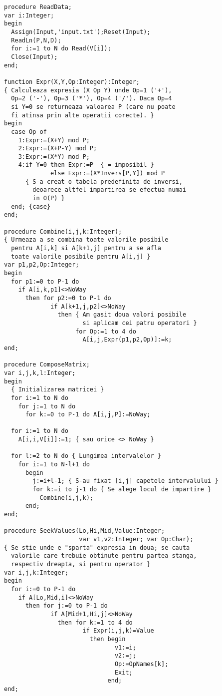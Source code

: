\begin{verbatim}
procedure ReadData;
var i:Integer;
begin
  Assign(Input,'input.txt');Reset(Input);
  ReadLn(P,N,D);
  for i:=1 to N do Read(V[i]);
  Close(Input);
end;

function Expr(X,Y,Op:Integer):Integer;
{ Calculeaza expresia (X Op Y) unde Op=1 ('+'),
  Op=2 ('-'), Op=3 ('*'), Op=4 ('/'). Daca Op=4
  si Y=0 se returneaza valoarea P (care nu poate
  fi atinsa prin alte operatii corecte). }
begin
  case Op of
    1:Expr:=(X+Y) mod P;
    2:Expr:=(X+P-Y) mod P;
    3:Expr:=(X*Y) mod P;
    4:if Y=0 then Expr:=P  { = imposibil }
             else Expr:=(X*Invers[P,Y]) mod P
      { S-a creat o tabela predefinita de inversi,
        deoarece altfel impartirea se efectua numai
        in O(P) }
  end; {case}
end;

procedure Combine(i,j,k:Integer);
{ Urmeaza a se combina toate valorile posibile
  pentru A[i,k] si A[k+1,j] pentru a se afla
  toate valorile posibile pentru A[i,j] }
var p1,p2,Op:Integer;
begin
  for p1:=0 to P-1 do
    if A[i,k,p1]<>NoWay
      then for p2:=0 to P-1 do
             if A[k+1,j,p2]<>NoWay
               then { Am gasit doua valori posibile
                      si aplicam cei patru operatori }
                    for Op:=1 to 4 do
                      A[i,j,Expr(p1,p2,Op)]:=k;
end;

procedure ComposeMatrix;
var i,j,k,l:Integer;
begin
  { Initializarea matricei }
  for i:=1 to N do
    for j:=1 to N do
      for k:=0 to P-1 do A[i,j,P]:=NoWay;

  for i:=1 to N do
    A[i,i,V[i]]:=1; { sau orice <> NoWay }

  for l:=2 to N do { Lungimea intervalelor }
    for i:=1 to N-l+1 do
      begin
        j:=i+l-1; { S-au fixat [i,j] capetele intervalului }
        for k:=i to j-1 do { Se alege locul de impartire }
          Combine(i,j,k);
      end;
end;

procedure SeekValues(Lo,Hi,Mid,Value:Integer;
                     var v1,v2:Integer; var Op:Char);
{ Se stie unde e "sparta" expresia in doua; se cauta
  valorile care trebuie obtinute pentru partea stanga,
  respectiv dreapta, si pentru operator }
var i,j,k:Integer;
begin
  for i:=0 to P-1 do
    if A[Lo,Mid,i]<>NoWay
      then for j:=0 to P-1 do
             if A[Mid+1,Hi,j]<>NoWay
               then for k:=1 to 4 do
                      if Expr(i,j,k)=Value
                        then begin
                               v1:=i;
                               v2:=j;
                               Op:=OpNames[k];
                               Exit;
                             end;
end;


\end{verbatim}
